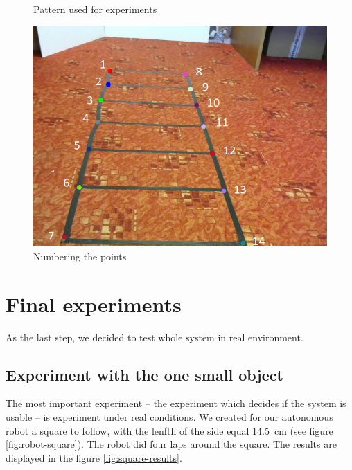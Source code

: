 \begin{figure}
\centering
{}
\caption{Pattern used for experiments}
\label{fig:grid}
\end{figure}

\begin{figure}
\centering
\includegraphics[width=0.8\linewidth]{img/experiments/right-ladder-numbered.png}
\caption{Numbering the points}
\label{fig:ladder_numbered}
\end{figure}

\section{Final experiments}

As the last step, we decided to test whole system in real environment.

\subsection{Experiment with the one small object}

The most important experiment -- the experiment which decides if the system is
usable -- is experiment under real conditions. We created for our autonomous
robot a square to follow, with the lenfth of the side equal 14.5~cm (see figure
\ref{fig:robot-square}). The robot did four laps around the square. The
results are displayed in the figure \ref{fig:square-results}.

